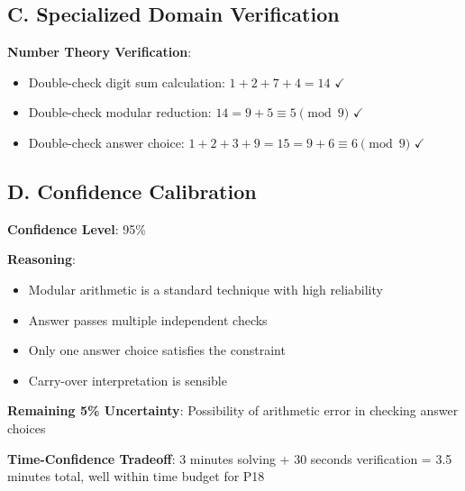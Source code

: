 \documentclass[]{article}
\begin{document}
\begin{verificationbox}
\subsection*{C. Specialized Domain Verification}
\textbf{Number Theory Verification}:
\begin{itemize}
    \item Double-check digit sum calculation: $1+2+7+4 = 14$ $\checkmark$
    \item Double-check modular reduction: $14 = 9 + 5 \equiv 5 \pmod{9}$ $\checkmark$
    \item Double-check answer choice: $1+2+3+9 = 15 = 9 + 6 \equiv 6 \pmod{9}$ $\checkmark$
\end{itemize}

\subsection*{D. Confidence Calibration}
\textbf{Confidence Level}: 95\%

\textbf{Reasoning}:
\begin{itemize}
    \item Modular arithmetic is a standard technique with high reliability
    \item Answer passes multiple independent checks
    \item Only one answer choice satisfies the constraint
    \item Carry-over interpretation is sensible
\end{itemize}

\textbf{Remaining 5\% Uncertainty}: Possibility of arithmetic error in checking answer choices

\textbf{Time-Confidence Tradeoff}: 3 minutes solving + 30 seconds verification = 3.5 minutes total, well within time budget for P18
\end{verificationbox}
\end{document}
